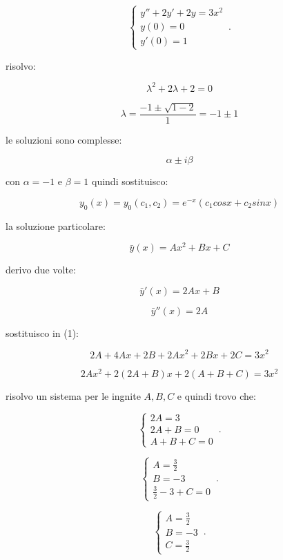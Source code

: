 \documentclass[11pt]{article}
\begin{document}
    \begin{equation}
        \begin{cases}
            y''+ 2y'+ 2y= 3x^{2}\\
            y(0) = 0\\
            y'(0) = 1
        \end{cases}\,.
    \end{equation}


risolvo:

\[
    \lambda^{2}+2 \lambda+2 =0
\]

\[
    \lambda= \frac{-1 \pm \sqrt{1-2}}{1}= -1 \pm 1
\]

le soluzioni sono complesse:

\[
    \alpha \pm  i \beta
\]

con $\alpha = -1$ e $\beta = 1$ quindi sostituisco:

\[
    y_0(x) = y_0(c_1,c_2) = e ^{-x}(c_1cosx + c_2 sinx)
\]

la soluzione particolare:

\[
    \bar{y} (x) = A x^{2}+Bx+C
\]

derivo due volte:

\[
    \bar{y} '(x) = 2Ax + B
\]

\[
    \bar{y} ''(x) = 2A
\]

sostituisco in (1):

\[
    2A + 4Ax + 2B + 2Ax^{2}+2Bx + 2C = 3x^{2}
\]

\[
    2Ax^{2} + 2(2A+B) x + 2(A+B+C) = 3x^{2}
\]

risolvo un sistema per le ingnite $A,B,C$ e quindi trovo che:

    \begin{equation}
        \begin{cases}
            2A = 3\\
            2A + B = 0\\
            A+B+C= 0
        \end{cases}\,.
    \end{equation}

    \begin{equation}
        \begin{cases}
            A=\frac{3}{2}\\
            B=-3\\
            \frac{3}{2}-3+C=0
        \end{cases}\,.
    \end{equation}

    \begin{equation}
        \begin{cases}
            A=\frac{3}{2}\\
            B=-3\\
            C=\frac{3}{2}
        \end{cases}\,.
    \end{equation}
\end{document}
